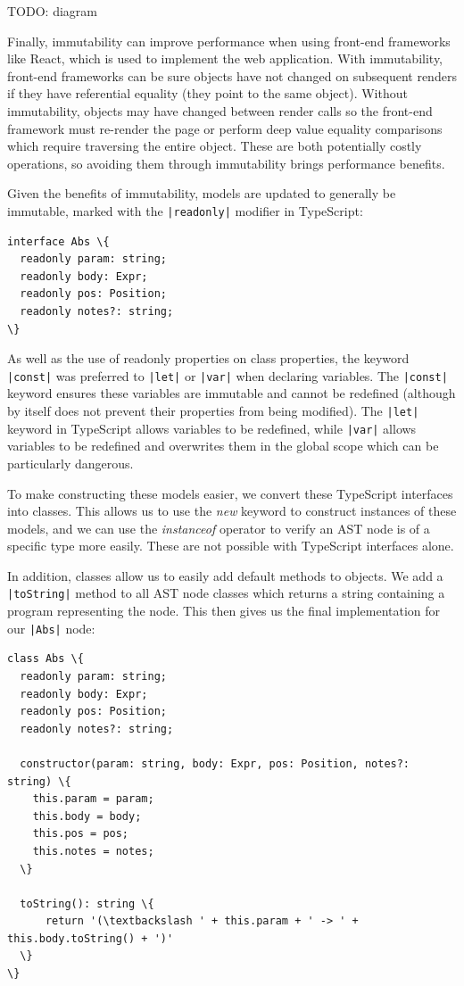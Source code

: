 \documentclass[a4paper,fleqn,twoside,12pt]{report}
\begin{document}
TODO: diagram

Finally, immutability can improve performance when using front-end frameworks like React, which is used to implement the web application. With immutability, front-end frameworks can be sure objects have not changed on subsequent renders if they have referential equality (they point to the same object). Without immutability, objects may have changed between render calls so the front-end framework must re-render the page or perform deep value equality comparisons which require traversing the entire object. These are both potentially costly operations, so avoiding them through immutability brings performance benefits.

Given the benefits of immutability, models are updated to generally be immutable, marked with the \texttt{|readonly|} modifier in TypeScript:

\begin{verbatim}
interface Abs \{
  readonly param: string;
  readonly body: Expr;
  readonly pos: Position;
  readonly notes?: string;
\}
\end{verbatim}

As well as the use of readonly properties on class properties, the keyword \texttt{|const|} was preferred to \texttt{|let|} or \texttt{|var|} when declaring variables. The \texttt{|const|} keyword ensures these variables are immutable and cannot be redefined (although by itself does not prevent their properties from being modified). The \texttt{|let|} keyword in TypeScript allows variables to be redefined, while \texttt{|var|} allows variables to be redefined and overwrites them in the global scope which can be particularly dangerous.

To make constructing these models easier, we convert these TypeScript interfaces into classes. This allows us to use the \textit{new} keyword to construct instances of these models, and we can use the \textit{instanceof} operator to verify an AST node is of a specific type more easily. These are not possible with TypeScript interfaces alone.

In addition, classes allow us to easily add default methods to objects. We add a \texttt{|toString|} method to all AST node classes which returns a string containing a program representing the node. This then gives us the final implementation for our \texttt{|Abs|} node:

\begin{verbatim}
class Abs \{
  readonly param: string;
  readonly body: Expr;
  readonly pos: Position;
  readonly notes?: string;

  constructor(param: string, body: Expr, pos: Position, notes?: string) \{
    this.param = param;
    this.body = body;
    this.pos = pos;
    this.notes = notes;
  \}

  toString(): string \{
      return '(\textbackslash ' + this.param + ' -> ' + this.body.toString() + ')'
  \}
\}
\end{verbatim}
\end{document}
